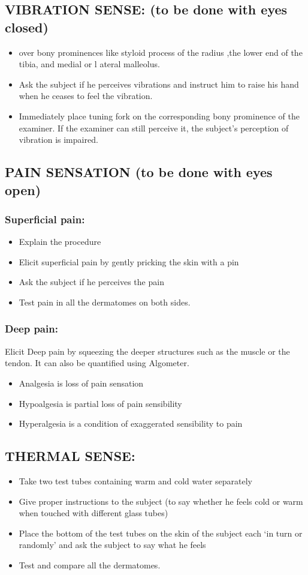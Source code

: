 \documentclass[a4paper,12pt]{book}
\begin{document}
\subsection*{VIBRATION SENSE: (to be done with eyes closed)}
\begin{itemize}
\item{over bony prominences like styloid process of the radius ,the lower end of the tibia, and medial or l ateral malleolus.}
\item{Ask the subject if he perceives vibrations and instruct him to raise his hand when he ceases to feel the vibration.}
\item{Immediately place tuning fork on the corresponding bony prominence of the examiner. If the examiner can still perceive it, the subject's perception of vibration is impaired.}
\end{itemize}
\subsection*{PAIN SENSATION (to be done with eyes open)}
\subsubsection*{Superficial pain:}
\begin{itemize}
\item{Explain the procedure}
\item{Elicit superficial pain by gently pricking the skin with a pin}
\item{Ask the subject if he perceives the pain}
\item{Test pain in all the dermatomes on both sides.}
\end{itemize}
\subsubsection*{Deep pain:}
	Elicit Deep pain by squeezing the deeper structures such as the muscle or the tendon. It can also be quantified using Algometer.
	\begin{itemize}
\item{Analgesia is loss of pain sensation}
\item{Hypoalgesia is partial loss of pain sensibility}
\item{Hyperalgesia is a condition of exaggerated sensibility to pain}
	\end{itemize}
	\subsection*{THERMAL SENSE:}
	\begin{itemize}
\item{Take two test tubes containing warm and cold water separately}
\item{Give proper instructions to the subject (to say whether he feels cold or warm when touched with different glass tubes)}
\item{Place the bottom of the test tubes on the skin of the subject each ‘in turn or randomly’ and ask the subject to say what he feels}
\item{Test and compare all the dermatomes.}
	\end{itemize}
\end{document}
